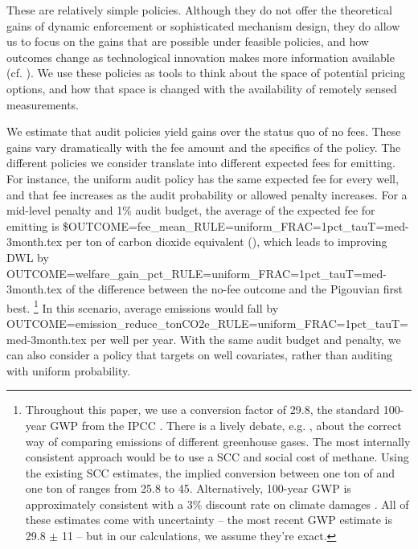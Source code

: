 \documentclass[12pt,oneside,letterpaper]{article}
\theoremstyle{definition}
\begin{document}
\begin{refsection}
These are relatively simple policies.
Although they do not offer the theoretical gains of dynamic enforcement or sophisticated mechanism design, they do allow us to focus on the gains that are possible under
feasible policies, and how outcomes change as technological innovation makes more information available
(cf.
\cite{Blundell/Gowrisankaran/Langer:2020, Cicala/Hemous/Olsen:2019, Oestreich:2017}).
We use these policies as tools to think about the space of potential pricing options, and how that space is changed with the availability of remotely sensed measurements.


We estimate that audit policies yield gains over the status quo of no fees.
These gains vary dramatically with the fee amount and the specifics of the policy.
The different policies we consider translate into different expected fees for emitting.
For instance, the uniform audit policy has the same expected fee for every well, and that fee increases as the audit probability or allowed penalty increases.
For a mid-level penalty and 1\% audit budget, the average of the expected fee for emitting is
\${OUTCOME=fee_mean_RULE=uniform_FRAC=1pct_tauT=med-3month.tex} per ton of carbon dioxide equivalent (),
which leads to improving \gls{DWL} by
{OUTCOME=welfare_gain_pct_RULE=uniform_FRAC=1pct_tauT=med-3month.tex}
of the difference between the no-fee outcome and the Pigouvian first best.%
\footnote{
Throughout this paper, we use a  conversion factor of 29.8, the standard 100-year \gls{GWP} from the \gls{IPCC} \parencite{ipcc_ar6_methane_gwp}.
There is a lively debate, e.g. \textcite{Allen/Shine/Fuglestvedt/Millar/Cain/Frame/Macey:2018}, about the correct way of comparing emissions of different greenhouse gases.
The most internally consistent approach would be to use a \gls{SCC} and social cost of methane.
Using the existing \gls{SCC} estimates, the implied conversion between one ton of  and one ton of  ranges from 25.8 to 45.
Alternatively, 100-year \gls{GWP} is approximately consistent with a 3\% discount rate on climate damages
\parencite{Sarofim/Giordano:2018, Mallapragada/Mignone:2019}.
All of these estimates come with uncertainty -- the most recent GWP estimate is 29.8 $\pm$ 11 -- but in our calculations, we assume they're exact.
}
In this scenario, average emissions would fall by
{OUTCOME=emission_reduce_tonCO2e_RULE=uniform_FRAC=1pct_tauT=med-3month.tex}
 per well per year.
With the same audit budget and penalty, we can also consider a policy that targets on well covariates, rather than auditing with uniform probability.

\end{refsection}
\end{document}
